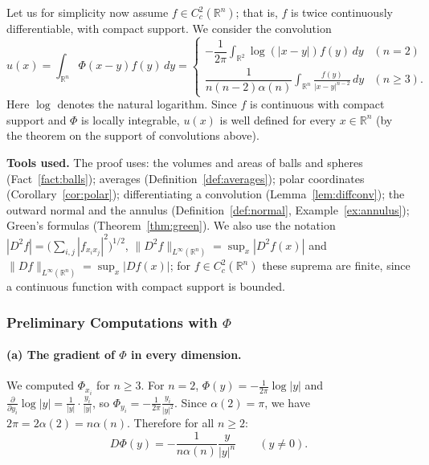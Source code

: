 \documentclass[11pt]{article}
\theoremstyle{plain}
\theoremstyle{definition}
\theoremstyle{remark}
\begin{document}
Let us for simplicity now assume $f \in C^2_c(\mathbb{R}^n)$; that is, $f$ is twice continuously differentiable, with compact support. We consider the convolution
\begin{equation}\label{eq:newton}
u(x) = \int_{\mathbb{R}^n} \Phi(x-y) f(y)\, dy
= \begin{cases}
-\dfrac{1}{2\pi} \displaystyle\int_{\mathbb{R}^2} \log(|x-y|) f(y)\, dy & (n=2) \\[1.2em]
\dfrac{1}{n(n-2)\alpha(n)} \displaystyle\int_{\mathbb{R}^n} \frac{f(y)}{|x-y|^{n-2}}\, dy & (n \geq 3).
\end{cases}
\end{equation}
Here $\log$ denotes the natural logarithm. Since $f$ is continuous with compact support and $\Phi$ is locally integrable, $u(x)$ is well defined for every $x \in \mathbb{R}^n$ (by the theorem on the support of convolutions above).

\textbf{Tools used.} The proof uses: the volumes and areas of balls and spheres (Fact~\ref{fact:balls}); averages (Definition~\ref{def:averages}); polar coordinates (Corollary~\ref{cor:polar}); differentiating a convolution (Lemma~\ref{lem:diffconv}); the outward normal and the annulus (Definition~\ref{def:normal}, Example~\ref{ex:annulus}); Green's formulas (Theorem~\ref{thm:green}). We also use the notation $|D^2 f| = \big(\sum_{i,j} |f_{x_i x_j}|^2\big)^{1/2}$, $\|D^2 f\|_{L^\infty(\mathbb{R}^n)} = \sup_{x} |D^2 f(x)|$ and $\|Df\|_{L^\infty(\mathbb{R}^n)} = \sup_{x} |Df(x)|$; for $f \in C^2_c(\mathbb{R}^n)$ these suprema are finite, since a continuous function with compact support is bounded.

\subsubsection{Preliminary Computations with $\Phi$}

\paragraph{(a) The gradient of $\Phi$ in every dimension.} We computed $\Phi_{x_i}$ for $n \geq 3$. For $n = 2$, $\Phi(y) = -\frac{1}{2\pi}\log|y|$ and $\frac{\partial}{\partial y_i}\log|y| = \frac{1}{|y|}\cdot\frac{y_i}{|y|}$, so $\Phi_{y_i} = -\frac{1}{2\pi}\frac{y_i}{|y|^2}$. Since $\alpha(2) = \pi$, we have $2\pi = 2\alpha(2) = n\alpha(n)$. Therefore for all $n \geq 2$:
\begin{equation}\label{eq:DPhi}
D\Phi(y) = -\frac{1}{n\alpha(n)} \frac{y}{|y|^n} \qquad (y \neq 0).
\end{equation}
\end{document}

